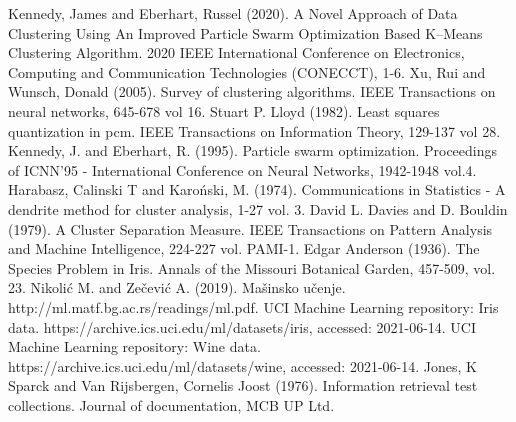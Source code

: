 \documentclass[a4paper,serbian]{symopissr}
\begin{document}
\begin{thebibliography}{99}
 Kennedy, James and Eberhart, Russel (2020). A Novel Approach of Data Clustering Using An Improved Particle Swarm Optimization Based K–Means Clustering Algorithm. 2020 IEEE International Conference on Electronics, Computing and Communication Technologies (CONECCT), 1-6.
 Xu, Rui and Wunsch, Donald (2005). Survey of clustering algorithms. IEEE Transactions on neural networks, 645-678 vol 16.
 Stuart P. Lloyd (1982). Least squares quantization in pcm.
    IEEE Transactions on Information Theory, 129-137 vol 28.
 Kennedy, J. and Eberhart, R. (1995). Particle swarm optimization. Proceedings of ICNN'95 - International Conference on Neural Networks, 1942-1948 vol.4.
 Harabasz, Calinski T and Karo{\'n}ski, M. (1974). Communications in Statistics - A dendrite method for cluster analysis, 1-27 vol. 3.  
 David L. Davies and D. Bouldin (1979). A Cluster Separation Measure. IEEE Transactions on Pattern Analysis and Machine Intelligence, 224-227 vol. PAMI-1.
 Edgar Anderson (1936). The Species Problem in Iris. Annals of the Missouri Botanical Garden, 457-509, vol. 23.
 Nikolić M. and Zečević A. (2019). Mašinsko učenje.  
	http://ml.matf.bg.ac.rs/readings/ml.pdf.
 UCI Machine Learning repository: Iris data. https://archive.ics.uci.edu/ml/datasets/iris, accessed: 2021-06-14.
 UCI Machine Learning repository: Wine data. https://archive.ics.uci.edu/ml/datasets/wine, accessed: 2021-06-14.
 Jones, K Sparck and Van Rijsbergen, Cornelis Joost (1976). Information retrieval test collections. Journal of documentation, MCB UP Ltd.
\end{thebibliography}
\end{document}

